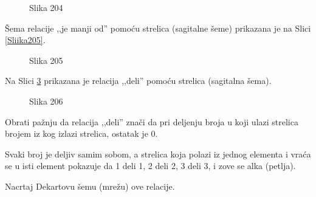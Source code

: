     \begin{figure}[H] 

        \center


        \caption{Slika 204}

        \label{Slika204}

    \end{figure}



    \v Sema relacije ,,je manji od'' pomo\' cu strelica (sagitalne \v seme) prikazana je na Slici \ref{Sliika205}.



    \begin{figure}[H] 

        \center


        \caption{Slika 205}

        \label{Slika205}

    \end{figure}



    \begin{zad}

        Na Slici \ref{Slika206} prikazana je relacija ,,deli'' pomo\' cu strelica (sagitalna \v sema).

    \end{zad}



    \begin{figure}[H] 

        \center


        \caption{Slika 206}

        \label{Slika206}

    \end{figure}



    Obrati pa\v znju da relacija ,,deli'' zna\v ci da pri deljenju broja u koji ulazi strelica brojem iz kog izlazi strelica, ostatak je 0.



    Svaki broj je deljiv samim sobom, a strelica koja polazi iz jednog elementa i vra\' ca se u isti element pokazuje da 1 deli 1, 2 deli 2, 3 deli 3, i zove se alka (petlja).



    Nacrtaj Dekartovu \v semu (mre\v zu) ove relacije.



